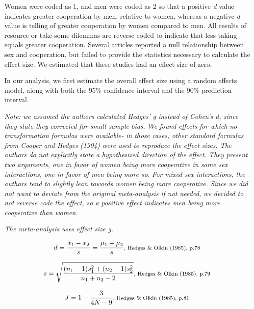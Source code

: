 \documentclass{article}
\begin{document}
Women were coded as 1, and men were coded as 2 so that a positive \textit{d} value indicates greater cooperation by men, relative to women, whereas a negative \textit{d} value is telling of greater cooperation by women compared to men. All results of resource or take-some dilemmas are reverse coded to indicate that less taking equals greater cooperation. Several articles reported a null relationship between sex and cooperation, but failed to provide the statistics necessary to calculate the effect size. We estimated that these studies had an effect size of zero. 

In our analysis, we first estimate the overall effect size using a random effects model, along with both the 95\% confidence interval and the 90\% prediction interval.

\vspace{3 mm}
\textit{Note: we assumed the authors calculated Hedges' g instead of Cohen's d, since they state they corrected for small sample bias. We found effects for which no transformation formulas were available- in those cases, other standard formulas from Cooper and Hedges (1994) were used to reproduce the effect sizes. The authors do not explicitly state a hypothesized direction of the effect. They present two arguments, one in favor of women being more cooperative in same sex interactions, one in favor of men being more so. For mixed sex interactions, the authors tend to slightly lean towards women being more cooperative. Since we did not want to deviate from the original meta-analysis if not needed, we decided to not reverse code the effect, so a positive effect indicates men being more cooperative than women.}

\vspace{3mm}
\textit{The meta-analysis uses effect size g.}

\begin{equation*}
d={\frac {{\bar {x}}_{1}-{\bar {x}}_{2}}{s}}={\frac {\mu_{1}-\mu_{2}}{s}}  \mbox {\footnotesize, Hedges \& Olkin (1985), p.78 } 
\end{equation*}

\begin{equation*}
s={\sqrt {\frac {(n_{1}-1)s_{1}^{2}+(n_{2}-1)s_{2}^{2}}{n_{1}+n_{2}-2}}} \mbox{\footnotesize, Hedges \& Olkin (1985), p.79 } 
\end{equation*}

\begin{equation*}
J={1-{\frac {3}{4N-9}}} \mbox{\footnotesize, Hedges \& Olkin (1985), p.81 }
\end{equation*} 
\end{document}
